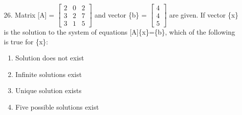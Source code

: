 \documentclass[journal]{IEEEtran}
\begin{document}
\begin{enumerate}
    \item[26.] Matrix [A] = $\begin{bmatrix} 2&0&2\\3&2&7\\3&1&5\end{bmatrix}$ and vector \{b\} = $\begin{bmatrix}4\\4\\5\end{bmatrix}$ are given. If vector \{x\} is the solution to the system of equations [A]\{x\}=\{b\}, which of the following is true for \{x\}:
    \begin{enumerate}[label=(\Alph*)]
        \item Solution does not exist
        \item Infinite solutions exist
        \item Unique solution exists 
        \item Five possible solutions exist 
    \end{enumerate} 
\end{enumerate}
\end{document}
